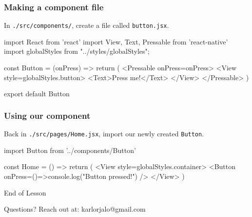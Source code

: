 \documentclass{beamer}
\begin{document}
  \begin{frame}[fragile]
    \frametitle{Making a component file}
    In \verb|./src/components/|, create a file called \verb|button.jsx|. 

    \vspace{0.5cm}
    \begin{jscodesmall}
import React from 'react'
import {View, Text, Pressable} from 'react-native'
import globalStyles from "../styles/globalStyles";

const Button = ({onPress}) => {
  return (
    <Pressable onPress={onPress}>
      <View style={globalStyles.button}>
        <Text>Press me!</Text>
      </View>
    </Pressable>
  )
}

export default Button
    \end{jscodesmall}
  \end{frame}

  \begin{frame}[fragile]
    \frametitle{Using our component}
    Back in \verb|./src/pages/Home.jsx|, import our newly created \verb|Button|.

    \vspace{0.5cm}
    \begin{jscodesmall}
import Button from '../components/Button'

const Home = () => {
  return (
    <View style={globalStyles.container}>
      <Button onPress={()=>{console.log("Button pressed!")}} />
    </View>
  )
}
    \end{jscodesmall}
  \end{frame}

  \appendix

  \begin{frame}[standout]
    End of Lesson

    {\small Questions? Reach out at:}
    {\footnotesize karlorjalo@gmail.com}
  \end{frame}
\end{document}
